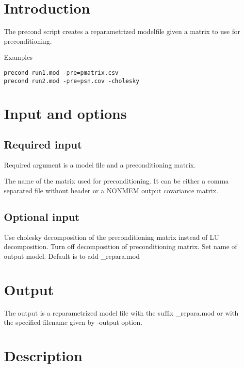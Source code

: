 



\maketitle


\section{Introduction}
The precond script creates a reparametrized modelfile given a matrix to use for preconditioning.

Examples
\begin{verbatim}
precond run1.mod -pre=pmatrix.csv
precond run2.mod -pre=psn.cov -cholesky 
\end{verbatim}

\section{Input and options}

\subsection{Required input}
Required argument is a model file and a preconditioning matrix.

\begin{optionlist}

The name of the matrix used for preconditioning. It can be either a comma separated file without header or a NONMEM output covariance matrix.
\nextopt
\end{optionlist}

\subsection{Optional input}

\begin{optionlist}
Use cholesky decomposition of the preconditioning matrix instead of LU decomposition.
Turn off decomposition of preconditioning matrix.
Set name of output model. Default is to add \_repara.mod
\end{optionlist}

\section{Output}

The output is a reparametrized model file with the suffix \_repara.mod or with the specified filename given by -output option.


\section{Description}







